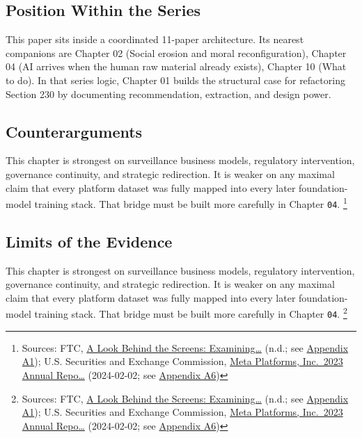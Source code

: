 \documentclass[
  american,
  11pt,
  letterpaper,
]{article}
\begin{document}
\subsection{Position Within the
Series}\label{position-within-the-series}

This paper sits inside a coordinated 11-paper architecture. Its nearest
companions are Chapter 02 (Social erosion and moral reconfiguration),
Chapter 04 (AI arrives when the human raw material already exists),
Chapter 10 (What to do). In that series logic, Chapter 01 builds the
structural case for refactoring Section 230 by documenting
recommendation, extraction, and design power.

\subsection{Counterarguments}\label{counterarguments}

This chapter is strongest on surveillance business models, regulatory
intervention, governance continuity, and strategic redirection. It is
weaker on any maximal claim that every platform dataset was fully mapped
into every later foundation-model training stack. That bridge must be
built more carefully in Chapter \texttt{04}. \footnote{Sources: FTC,
  \href{https://www.ftc.gov/reports/look-behind-screens-examining-data-practices-social-media-video-streaming-services}{A
  Look Behind the Screens: Examining\ldots{}} (n.d.; see
  \hyperref[appendix-a1-a-look-behind-the-screens-examining-the-data-practices-of-social-media-and-video-streaming-services]{Appendix
  A1}); U.S. Securities and Exchange Commission,
  \href{https://www.sec.gov/Archives/edgar/data/1326801/000132680124000012/meta-20231231.htm}{Meta
  Platforms, Inc.~2023 Annual Repo\ldots{}} (2024-02-02; see
  \hyperref[appendix-a6-meta-platforms-inc-2023-annual-report-form-10-k]{Appendix
  A6})}

\subsection{Limits of the Evidence}\label{limits-of-the-evidence}

This chapter is strongest on surveillance business models, regulatory
intervention, governance continuity, and strategic redirection. It is
weaker on any maximal claim that every platform dataset was fully mapped
into every later foundation-model training stack. That bridge must be
built more carefully in Chapter \texttt{04}. \footnote{Sources: FTC,
  \href{https://www.ftc.gov/reports/look-behind-screens-examining-data-practices-social-media-video-streaming-services}{A
  Look Behind the Screens: Examining\ldots{}} (n.d.; see
  \hyperref[appendix-a1-a-look-behind-the-screens-examining-the-data-practices-of-social-media-and-video-streaming-services]{Appendix
  A1}); U.S. Securities and Exchange Commission,
  \href{https://www.sec.gov/Archives/edgar/data/1326801/000132680124000012/meta-20231231.htm}{Meta
  Platforms, Inc.~2023 Annual Repo\ldots{}} (2024-02-02; see
  \hyperref[appendix-a6-meta-platforms-inc-2023-annual-report-form-10-k]{Appendix
  A6})}
\end{document}
